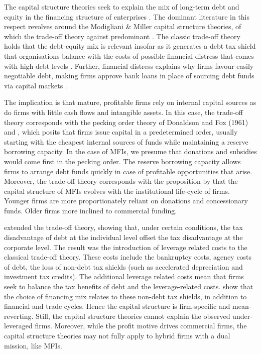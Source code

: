 \documentclass[a4paper, nobind]{templates/ociamthesis}
\begin{document}
The capital structure theories seek to explain the mix of long-term debt and equity in the financing structure of enterprises \autocite{ehrhardt2016corporate}. The dominant literature in this respect revolves around the Modigliani \& Miller capital structure theories, of which the trade-off theory against predominant \autocite{sun2016ownership}. The classic trade-off theory holds that the debt-equity mix is relevant insofar as it generates a debt tax shield that organisations balance with the costs of possible financial distress that comes with high debt levels \autocite{liu2017optimal}. Further, financial distress explains why firms favour easily negotiable debt, making firms approve bank loans in place of sourcing debt funds via capital markets \autocite{de2011firms}.

The implication is that mature, profitable firms rely on internal capital sources as do firms with little cash flows and intangible assets. In this case, the trade-off theory corresponds with the pecking order theory of Donaldson and Fox (1961) and \textcite{myers1984corporate}, which posits that firms issue capital in a predetermined order, usually starting with the cheapest internal sources of funds while maintaining a reserve borrowing capacity. In the case of MFIs, we presume that donations and subsidies would come first in the pecking order. The reserve borrowing capacity allows firms to arrange debt funds quickly in case of profitable opportunities that arise. Moreover, the trade-off theory corresponds with the proposition by \textcite{bayai2016financing} that the capital structure of MFIs evolves with the institutional life-cycle of firms. Younger firms are more proportionately reliant on donations and concessionary funds. Older firms more inclined to commercial funding.

\textcite{bradley1984existence} extended the trade-off theory, showing that, under certain conditions, the tax disadvantage of debt at the individual level offset the tax disadvantage at the corporate level. The result was the introduction of leverage related costs to the classical trade-off theory. These costs include the bankruptcy costs, agency costs of debt, the loss of non-debt tax shields (such as accelerated depreciation and investment tax credits). The additional leverage related costs mean that firms seek to balance the tax benefits of debt and the leverage-related costs. \textcite{miao2005optimal} show that the choice of financing mix relates to these non-debt tax shields, in addition to financial and trade cycles. Hence the capital structure is firm-specific and mean-reverting. Still, the capital structure theories cannot explain the observed under-leveraged firms. Moreover, while the profit motive drives commercial firms, the capital structure theories may not fully apply to hybrid firms with a dual mission, like MFIs.
\end{document}
